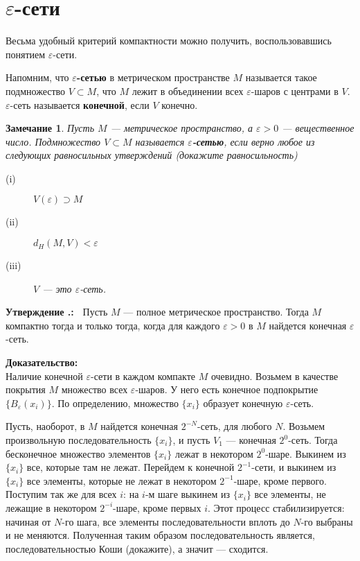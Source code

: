 \documentclass[12pt]{book}
\def\endproof{\hbox{\vrule width 5pt height 5pt depth 0pt}}
\renewcommand{\epsilon}{\varepsilon}
\theoremstyle{upshape}
\newtheorem{zadacha}{Задача}[chapter]
\theoremstyle{generic}
\newtheorem{remark}[teorema]{Замечание}
\def\замечание{\begin{remark}}
\def\еза{\end{remark}}
\theoremstyle{upshapenonumber}
\newtheorem{ukazanie}{Указание}[section]
\newcommand{\следствие}{%
     \refstepcounter{teorema}
     {\noindent\bf Следствие \thechapter.\arabic{teorema}:\ }}
\newcommand{\пример}{%
     \refstepcounter{teorema}
     {\noindent\bf Пример \thechapter.\arabic{teorema}:\ }}
\newcommand{\лемма}{%
     \refstepcounter{teorema}
     {\noindent\bf Лемма \thechapter.\arabic{teorema}:\ }}
\newcommand{\теорема}{%
     \refstepcounter{teorema}
     {\noindent\bf Теорема \thechapter.\arabic{teorema}:\ }}
\newcommand{\утверждение}{%
     \refstepcounter{teorema}
     {\noindent\bf Утверждение \thechapter.\arabic{teorema}:\ }}
\def\хфилл{\hfill}
\def\ноиндент{\noindent}
\def\бф{\bf}
\def\ем{\em}
\def\задача{\begin{zadacha}}
\def\ез{\end{zadacha}}
\def\указание{\begin{ukazanie}}
\def\еу{\end{ukazanie}}
\def\ео{\end{opredelenie}}
\def\енум{\begin{enumerate}}
\def\ее{\end{enumerate}}
\begin{document}

\section{$\epsilon$-сети}


Весьма удобный критерий компактности можно получить,
воспользовавшись понятием $\epsilon$-сети.


Напомним, что {\бф $\epsilon$-сетью} в 
метрическом пространстве $M$ называется
такое подмножество $V \subset M$, что $M$
лежит в объединении всех $\epsilon$-шаров с центрами в $V$.
$\epsilon$-сеть называется {\бф конечной},
если $V$ конечно. 


\замечание
Пусть $M$ --- метрическое пространство, а
$\epsilon >0$ --- вещественное число.
Подмножество $V\subset M$ называется {\бф
$\epsilon$-сетью}, если верно любое из следующих
равносильных утверждений (докажите равносильность)
\begin{description}
\item[(i)] $V(\epsilon) \supset M$
\item[(ii)] $d_H(M,V) < \epsilon$
\item[(iii)] $V$ --- это $\epsilon$-сеть.
\end{description}
\еза

\хфилл


\утверждение
Пусть $M$ --- полное метрическое пространство.
Тогда $M$ компактно тогда и только тогда, когда
для каждого $\epsilon >0$ в $M$ найдется конечная
$\epsilon$-сеть. 

\хфилл

\ноиндент
{\бф Доказательство:} \\
Наличие конечной $\epsilon$-сети в каждом
компакте $M$ очевидно. Возьмем в качестве
покрытия $M$ множество всех $\epsilon$-шаров.
У него есть конечное подпокрытие $\{ B_\epsilon(x_i)\}$.
По определению, множество $\{x_i\}$ образует конечную
$\epsilon$-сеть.

Пусть, наоборот, в $M$ найдется конечная
$2^{-N}$-сеть, для любого $N$.
Возьмем произвольную 
последовательность $\{x_i\}$,
и пусть $V_1$ --- конечная $2^{0}$-сеть.
Тогда бесконечное множество элементов
$\{x_i\}$ лежат в некотором $2^{0}$-шаре.
Выкинем из $\{x_i\}$ все, которые там не лежат. 
Перейдем к конечной $2^{-1}$-сети,
и выкинем из $\{x_i\}$ все элементы, которые
не лежат в некотором $2^{-1}$-шаре, кроме 
первого. Поступим так же для всех $i$:
на $i$-м шаге выкинем из  $\{x_i\}$ все 
элементы, не лежащие в некотором  $2^{-i}$-шаре,
кроме первых $i$. Этот процесс стабилизируется:
начиная от $N$-го шага, все элементы последовательности
вплоть до $N$-го выбраны и не меняются. 
Полученная таким образом последовательность является,
последовательностью Коши (докажите), а значит --- сходится. \endproof
\end{document}
